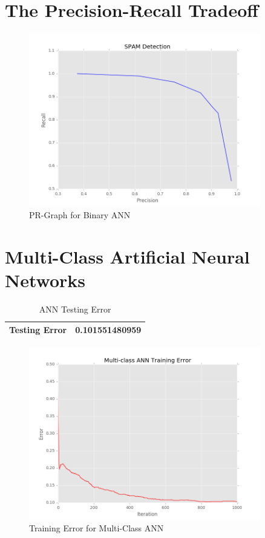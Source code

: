 \documentclass[12pt]{article}
\begin{document}
\section{The Precision-Recall Tradeoff}\label{Precision-Recall}
\begin{figure}[H]
\begin{center}
\includegraphics[width=0.9\textwidth]{precision_recall.png}
\caption{PR-Graph for Binary ANN}
\end{center}
\end{figure}

\newpage

\section{Multi-Class Artificial Neural Networks}\label{Multi-Class ANN}
\begin{table}[h]
\begin{center}
\begin{tabular}{|l|l|}
\hline
Testing Error & 0.101551480959\\
\hline
\end{tabular}
\caption{ANN Testing Error}
\end{center}
\end{table}

\begin{figure}[H]
\begin{center}
\includegraphics[width=0.9\textwidth]{multiclass_ann_training_errors.png}
\caption{Training Error for Multi-Class ANN}
\end{center}
\end{figure}
\end{document}
